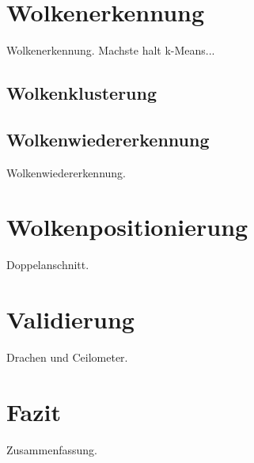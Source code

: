 \documentclass[a4paper,11pt,twoside,german]{article}
\newcommand{\literaturverzeichnis}[1]{
    \renewcommand{\harvardand}{und} %
    
    }
\begin{document}

\section{Wolkenerkennung}

Wolkenerkennung.
Machste halt k-Means...
\blindtext

\subsection{Wolkenklusterung}

\blindtext[3]



\subsection{Wolkenwiedererkennung}

Wolkenwiedererkennung.
\blindtext[3]




\section{Wolkenpositionierung}

Doppelanschnitt.
\blindtext[2]


\section{Validierung}

Drachen und Ceilometer.
\blindtext[3]




\section{Fazit}

Zusammenfassung.
\blindtext[3]


\literaturverzeichnis{bibliography.bib} %
\end{document}
